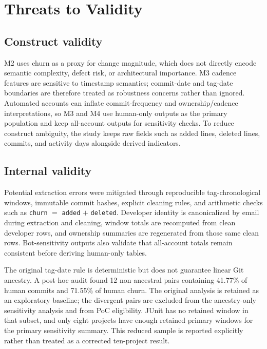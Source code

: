 \section{Threats to Validity}
\label{sec:threats_validity}

\subsection{Construct validity}
\label{sec:construct_validity}

M2 uses churn as a proxy for change magnitude, which does not directly encode semantic complexity,
defect risk, or architectural importance. M3 cadence features are sensitive to timestamp semantics;
commit-date and tag-date boundaries are therefore treated as robustness concerns rather than ignored.
Automated accounts can inflate commit-frequency and ownership/cadence interpretations, so M3 and M4
use human-only outputs as the primary population and keep all-account outputs for sensitivity checks.
To reduce construct ambiguity, the study keeps raw fields such as added lines, deleted lines, commits,
and activity days alongside derived indicators.

\subsection{Internal validity}
\label{sec:internal_validity}

Potential extraction errors were mitigated through reproducible tag-chronological windows, immutable commit hashes,
explicit cleaning rules, and arithmetic checks such as \texttt{churn} $=$ \texttt{added} $+$ \texttt{deleted}.
Developer identity is canonicalized by email during extraction and cleaning, window totals are recomputed
from clean developer rows, and ownership summaries are regenerated from those same clean rows. Bot-sensitivity
outputs also validate that all-account totals remain consistent before deriving human-only tables.

The original tag-date rule is deterministic but does not guarantee linear Git ancestry. A post-hoc audit found
12 non-ancestral pairs containing 41.77\% of human commits and 71.55\% of human churn. The original analysis is
retained as an exploratory baseline; the divergent pairs are excluded from the ancestry-only sensitivity analysis
and from PoC eligibility. JUnit has no retained window in that subset, and only eight projects have enough retained
primary windows for the primary sensitivity summary. This reduced sample is reported explicitly rather than treated
as a corrected ten-project result.


